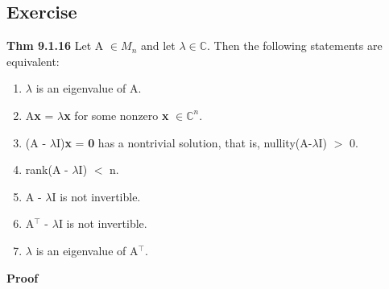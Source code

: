 \documentclass[12pt, letterpaper]{article}
\begin{document}
\subsection*{Exercise}
\textbf{Thm 9.1.16} Let A $\in M_n$ and let $\lambda \in \mathbb{C}$. Then the following statements are equivalent:
\begin{enumerate}
    \item $\lambda$ is an eigenvalue of A.
    \item A\textbf{x} = $\lambda$\textbf{x} for some nonzero \textbf{x} $\in \mathbb{C}^n$.
    \item (A - $\lambda$I)\textbf{x} = \textbf{0} has a nontrivial solution, that is, nullity(A-$\lambda$I) $>$ 0.
    \item rank(A - $\lambda$I) $<$ n.
    \item A - $\lambda$I is not invertible.
    \item A$^\top$ - $\lambda$I is not invertible.
    \item $\lambda$ is an eigenvalue of A$^\top$.
\end{enumerate}
\textbf{Proof}
\end{document}
